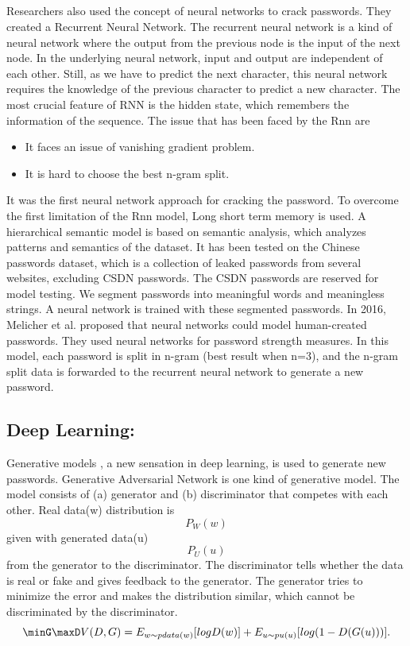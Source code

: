 \documentclass[runningheads]{llncs}
\begin{document}
\subsection{}
\newline
Researchers also used the concept of neural networks to crack passwords. They created a Recurrent Neural Network\cite{197243}.
The recurrent neural network is a kind of neural network where the output from the previous node is the input of the next node. In the underlying neural network, input and output are independent of each other. Still, as we have to predict the next character, this neural network requires the knowledge of the previous character to predict a new character. The most crucial feature of RNN is the hidden state, which remembers the information of the sequence. The issue that has been faced by the Rnn are \begin{itemize}
    \item It faces an issue of vanishing gradient problem.
    \item It is hard to choose the best n-gram split.
\end{itemize}
It was the first neural network approach for cracking the password.
To overcome the first limitation of the Rnn model, Long short term memory is used. \cite{DBLP:journals/corr/Lipton15} A hierarchical semantic model is based on semantic analysis, which analyzes patterns and semantics of the dataset. It has been tested on the Chinese passwords dataset, which is a collection of leaked passwords from several websites, excluding CSDN passwords. The CSDN passwords are reserved for model testing. We segment passwords into meaningful words and meaningless strings. A neural network is trained with these segmented passwords. \cite{10.1007/978-981-13-5913-2_6} In 2016, Melicher et al. proposed that neural networks could model human-created passwords. They used neural networks for password strength measures. \cite{197243} In this model, each password is split in n-gram (best result when n=3), and the n-gram split data is forwarded to the recurrent neural network to generate a new password.
\newline

\subsection{\textbf{Deep Learning:}}
\newline
Generative models \cite{goodfellow2014generative}, a new sensation in deep learning, is used to generate new passwords. Generative Adversarial Network is one kind of generative model. The model consists of (a) generator and (b) discriminator that competes with each other. Real data(w) distribution is \[{P_W(w)}\] given with generated data(u) \[{P_U(u)}\] from the generator to the discriminator. The discriminator tells whether the data is real or fake and gives feedback to the generator. The generator tries to minimize the error and makes the distribution similar, which cannot be discriminated by the discriminator.
\[ \minG  \maxD  V (D, G)=E _{w \sim pdata(w)}[log D(w)] + E _{u \sim p u(u)} [log(1-D(G(u)))]. \]
\newline
\newpage
\end{document}
